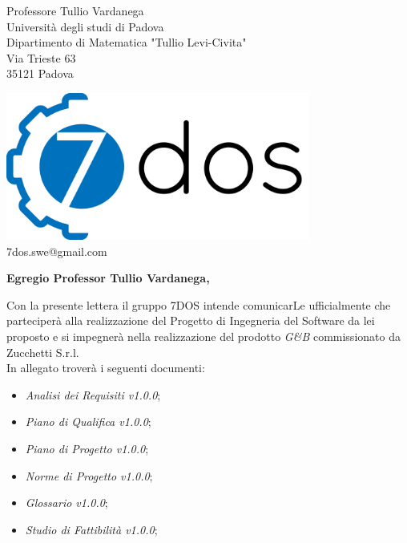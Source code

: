 \documentclass[12pt]{letter} %
\date{15/01/2018} %
\begin{document}



\begin{letter}{Professore Tullio Vardanega \\ Università degli studi di Padova \\ Dipartimento di Matematica "Tullio Levi-Civita" \\ Via Trieste 63 \\ 35121 Padova} %

\begin{center}
\includegraphics[width=10cm]{../logo}
7dos.swe@gmail.com
\end{center}

\opening{\textbf{Egregio Professor Tullio Vardanega,}}
\begin{addmargin}[2em]{2em}
  \hspace{1cm} Con la presente lettera il gruppo 7DOS intende comunicarLe ufficialmente che parteciperà alla realizzazione del Progetto di Ingegneria del Software da lei proposto e si impegnerà nella realizzazione del prodotto \emph{G\&B} commissionato da Zucchetti S.r.l.\\
  In allegato troverà i seguenti documenti:
      \begin{itemize}
      \item \emph{Analisi dei Requisiti v1.0.0};
      \item \emph{Piano di Qualifica v1.0.0};
      \item \emph{Piano di Progetto v1.0.0};
      \item \emph{Norme di Progetto v1.0.0};
      \item \emph{Glossario v1.0.0};
      \item \emph{Studio di Fattibilità v1.0.0};
      \end{itemize}


\end{addmargin}
\end{letter}
\end{document}
